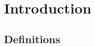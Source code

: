 \documentclass[11pt]{article}
\begin{document}
\section{Introduction}

\subsection{Definitions}
\
\end{document}
